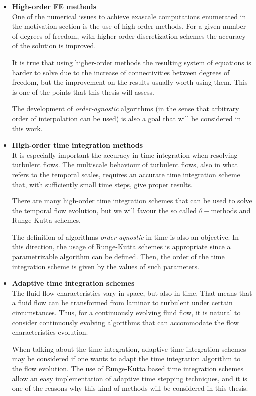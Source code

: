 \begin{itemize}
\item {\bf High-order FE methods}\\
One of the numerical issues to achieve exascale computations enumerated in the motivation section is the use of high-order methods. For a given number of degrees of freedom, with higher-order discretization schemes the accuracy of the solution is improved. 

It is true that using higher-order methods the resulting system of equations is harder to solve due to the increase of connectivities between degrees of freedom, but the improvement on the results usually worth using them. This is one of the points that this thesis will assess.

The development of \textit{order-agnostic} algorithms (in the sense that arbitrary order of interpolation can be used) is also a goal that will be considered in this work.

\item {\bf High-order time integration methods}\\
It is especially important the accuracy in time integration when resolving turbulent flows. The multiscale behaviour of turbulent flows, also in what refers to the temporal scales, requires an accurate time integration scheme that, with sufficiently small time steps, give proper results.

There are many high-order time integration schemes that can be used to solve the temporal flow evolution, but we will favour the so called $ \theta- $methods and Runge-Kutta schemes.

The definition of algorithms \textit{order-agnostic} in time is also an objective. In this direction, the usage of Runge-Kutta schemes is appropriate since a parametrizable algorithm can be defined. Then, the order of the time integration scheme is given by the values of such parameters.

\item {\bf Adaptive time integration schemes}\\
The fluid flow characteristics vary in space, but also in time. That means that a fluid flow can be transformed from laminar to turbulent under certain circumstances. Thus, for a continuously evolving fluid flow, it is natural to consider continuously evolving algorithms that can accommodate the flow characteristics evolution. 

When talking about the time integration, adaptive time integration schemes may be considered if one wants to adapt the time integration algorithm to the flow evolution. The use of Runge-Kutta based time integration schemes allow an easy implementation of adaptive time stepping techniques, and it is one of the reasons why this kind of methods will be considered in this thesis.


\end{itemize}
